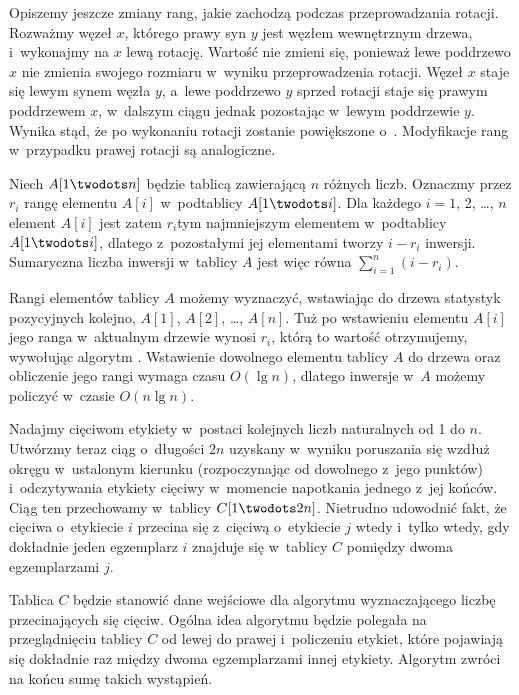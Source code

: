 Opiszemy jeszcze zmiany rang, jakie zachodzą podczas przeprowadzania rotacji.
Rozważmy węzeł $x$, którego prawy syn $y$ jest węzłem wewnętrznym drzewa, i~wykonajmy na $x$ lewą rotację.
Wartość  nie zmieni się, ponieważ lewe poddrzewo $x$ nie zmienia swojego rozmiaru w~wyniku przeprowadzenia rotacji.
Węzeł $x$ staje się lewym synem węzła $y$, a~lewe poddrzewo $y$ sprzed rotacji staje się prawym poddrzewem $x$, w~dalszym ciągu jednak pozostając w~lewym poddrzewie $y$.
Wynika stąd, że po wykonaniu rotacji  zostanie powiększone o~.
Modyfikacje rang w~przypadku prawej rotacji są analogiczne.

\exercise %
Niech $A[1\twodots n]$ będzie tablicą zawierającą $n$ różnych liczb.
Oznaczmy przez $r_i$ rangę elementu $A[i]$ w~podtablicy $A[1\twodots i]$.
Dla każdego $i=1$, 2, \dots, $n$ element $A[i]$ jest zatem $r_i$\nbhyphen tym najmniejszym elementem w~podtablicy $A[1\twodots i]$, dlatego z~pozostałymi jej elementami tworzy $i-r_i$ inwersji.
Sumaryczna liczba inwersji w~tablicy $A$ jest więc równa $\sum_{i=1}^n(i-r_i)$.

Rangi elementów tablicy $A$ możemy wyznaczyć, wstawiając do drzewa statystyk pozycyjnych kolejno, $A[1]$, $A[2]$, \dots, $A[n]$.
Tuż po wstawieniu elementu $A[i]$ jego ranga w~aktualnym drzewie wynosi $r_i$, którą to wartość otrzymujemy, wywołując algorytm .
Wstawienie dowolnego elementu tablicy $A$ do drzewa oraz obliczenie jego rangi wymaga czasu $O(\lg n)$, dlatego inwersje w~$A$ możemy policzyć w~czasie $O(n\lg n)$.

\exercise %
Nadajmy cięciwom etykiety w~postaci kolejnych liczb naturalnych od 1 do $n$.
Utwórzmy teraz ciąg o~długości $2n$ uzyskany w~wyniku poruszania się wzdłuż okręgu w~ustalonym kierunku (rozpoczynając od dowolnego z~jego punktów) i~odczytywania etykiety cięciwy w~momencie napotkania jednego z~jej końców.
Ciąg ten przechowamy w~tablicy $C[1\twodots2n]$.
Nietrudno udowodnić fakt, że cięciwa o~etykiecie $i$ przecina się z~cięciwą o~etykiecie $j$ wtedy i~tylko wtedy, gdy dokładnie jeden egzemplarz $i$ znajduje się w~tablicy $C$ pomiędzy dwoma egzemplarzami $j$.

Tablica $C$ będzie stanowić dane wejściowe dla algorytmu  wyznaczającego liczbę przecinających się cięciw.
Ogólna idea algorytmu będzie polegała na przeglądnięciu tablicy $C$ od lewej do prawej i~policzeniu etykiet, które pojawiają się dokładnie raz między dwoma egzemplarzami innej etykiety.
Algorytm zwróci na końcu sumę takich wystąpień.

